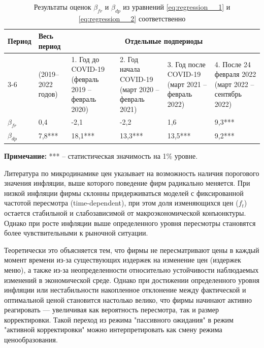 \begin{table}[h]
	\centering
	\small %
	\caption{Результаты оценок $\beta_{fr}$ и $\beta_{dp}$ из уравнений \ref{eq:regression__1} и \ref{eq:regression__2} соответственно}
	\label{tab:regression_period_results}
	\begin{tabularx}{\textwidth}{|X|X|X|X|X|X|}
		\hline
		\multirow{2}{*}{\textbf{Период}} & \textbf{Весь период} & \multicolumn{4}{c|}{\textbf{Отдельные подпериоды}} \\
		\cline{3-6}
		& (2019–2022 годов) & 1. Год до COVID-19 (февраль 2019 – февраль 2020) & 2. Год начала COVID-19 (март 2020 – февраль 2021) & 3. Год после COVID-19 (март 2021 – февраль 2022) & 4. После 24 февраля 2022 (март 2022 – сентябрь 2022) \\
		\hline
		$\beta_{fr}$ & 0,4 & -2,1 & -2,2 & 1,6 & 9,3*** \\
		\hline
		$\beta_{dp}$ & 7,8*** & 18,1*** & 13,3*** & 13,5*** & 9,2*** \\
		\hline
	\end{tabularx}
	\begin{tablenotes}
		\item \textbf{Примечание:} *** – статистическая значимость на 1\% уровне.
	\end{tablenotes}
\end{table}

Литература по микродинамике цен указывает на возможность наличия порогового значения инфляции, выше которого поведение фирм радикально меняется. При низкой инфляции фирмы склонны придерживаться моделей с фиксированной частотой пересмотра (time-dependent), при этом доля изменяющихся цен ($f_t$) остается стабильной и слабозависимой от макроэкономической конъюнктуры. Однако при росте инфляции выше определенного уровня пересмотры становятся более чувствительными к рыночной ситуации.

Теоретически это объясняется тем, что фирмы не пересматривают цены в каждый момент времени из-за существующих издержек на изменение цен (издержек меню), а также из-за неопределенности относительно устойчивости наблюдаемых изменений в экономической среде. Однако при достижении определенного уровня инфляции или нестабильности накопленное отклонение между фактической и оптимальной ценой становится настолько велико, что фирмы начинают активно реагировать — увеличивая как вероятность пересмотра, так и размер корректировки. Такой переход из режима "пассивного ожидания" в режим "активной корректировки" можно интерпретировать как смену режима ценообразования.

